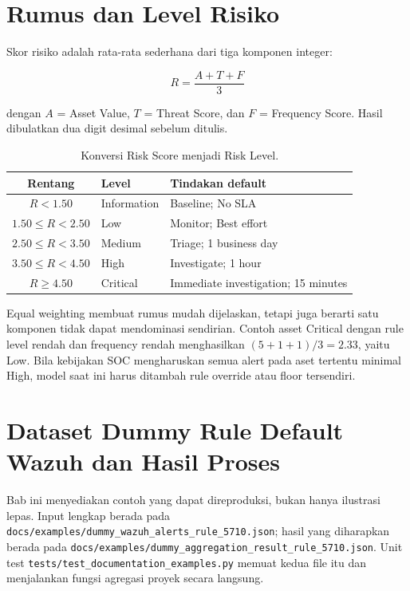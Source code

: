 \documentclass[11pt,a4paper,oneside]{report}
\DeclareRobustCommand{\code}[1]{\nolinkurl{#1}}
\begin{document}
\chapter{Rumus dan Level Risiko}

Skor risiko adalah rata-rata sederhana dari tiga komponen integer:

\[
  R = \frac{A + T + F}{3}
\]

dengan $A$ = Asset Value, $T$ = Threat Score, dan $F$ = Frequency Score.
Hasil dibulatkan dua digit desimal sebelum ditulis.

\begin{table}[ht]
\centering
\caption{Konversi Risk Score menjadi Risk Level.}
\begin{tabular}{cll}
\toprule
\textbf{Rentang} & \textbf{Level} & \textbf{Tindakan default}\\
\midrule
$R < 1.50$ & Information & Baseline; No SLA\\
$1.50 \le R < 2.50$ & Low & Monitor; Best effort\\
$2.50 \le R < 3.50$ & Medium & Triage; 1 business day\\
$3.50 \le R < 4.50$ & High & Investigate; 1 hour\\
$R \ge 4.50$ & Critical & Immediate investigation; 15 minutes\\
\bottomrule
\end{tabular}
\end{table}

Equal weighting membuat rumus mudah dijelaskan, tetapi juga berarti satu komponen
tidak dapat mendominasi sendirian. Contoh asset Critical dengan rule level rendah
dan frequency rendah menghasilkan $(5+1+1)/3=2.33$, yaitu Low. Bila kebijakan SOC
mengharuskan semua alert pada aset tertentu minimal High, model saat ini harus
ditambah rule override atau floor tersendiri.

\chapter{Dataset Dummy Rule Default Wazuh dan Hasil Proses}

Bab ini menyediakan contoh yang dapat direproduksi, bukan hanya ilustrasi lepas.
Input lengkap berada pada
\code{docs/examples/dummy_wazuh_alerts_rule_5710.json}; hasil yang diharapkan berada
pada \code{docs/examples/dummy_aggregation_result_rule_5710.json}. Unit test
\code{tests/test_documentation_examples.py} memuat kedua file itu dan menjalankan
fungsi agregasi proyek secara langsung.
\end{document}
